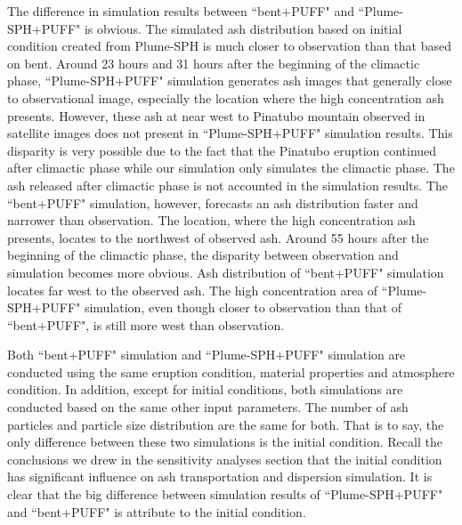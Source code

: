 The difference in simulation results between ``bent+PUFF" and ``Plume-SPH+PUFF" is obvious. The simulated ash distribution based on initial condition created from Plume-SPH is much closer to observation than that based on bent. Around 23 hours and 31 hours after the beginning of the climactic phase, ``Plume-SPH+PUFF" simulation generates ash images that generally close to observational image, especially the location where the high concentration ash presents. However, these ash at near west to Pinatubo mountain observed in satellite images does not present in ``Plume-SPH+PUFF" simulation results. This disparity is very possible due to the fact that the Pinatubo eruption continued after climactic phase while our simulation only simulates the climactic phase. The ash released after climactic phase is not accounted in the simulation results. The ``bent+PUFF" simulation, however, forecasts an ash distribution faster and narrower than observation. The location, where the high concentration ash presents, locates to the northwest of observed ash. 
Around 55 hours after the beginning of the climactic phase, the disparity between observation and simulation becomes more obvious. Ash distribution of ``bent+PUFF" simulation locates far west to the observed ash. The high concentration area of ``Plume-SPH+PUFF" simulation, even though closer to observation than that of ``bent+PUFF", is still more west than observation.

Both ``bent+PUFF" simulation and ``Plume-SPH+PUFF" simulation are conducted using the same eruption condition, material properties and atmosphere condition. In addition, except for initial conditions, both simulations are conducted based on the same other input parameters. The number of ash particles and particle size distribution are the same for both. That is to say, the only difference between these two simulations is the initial condition. Recall the conclusions we drew in the sensitivity analyses section that the initial condition has significant influence on ash transportation and dispersion simulation. It is clear that the big difference between simulation results of ``Plume-SPH+PUFF" and ``bent+PUFF" is attribute to the initial condition.

